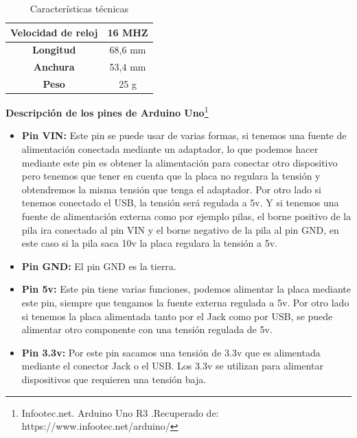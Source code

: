 \documentclass[12pt]{report}%
\begin{document}
\begin{table}[htbp]
\begin{tabular}{|c|c|}
\textbf{Velocidad de reloj}               & 16 MHZ                                                                                                                 \\ \hline
\textbf{Longitud}                         & 68,6 mm                                                                                                                \\ \hline
\textbf{Anchura}                          & 53,4 mm                                                                                                                \\ \hline
\textbf{Peso}                             & 25 g                                                                                                                   \\ \hline
\end{tabular}
\caption{Características técnicas}

\end{table}

\textbf{Descripción de los pines de Arduino Uno}\footnote{Infootec.net. Arduino Uno R3 .Recuperado de: https://www.infootec.net/arduino/}

\begin{itemize}
\item\textbf{Pin VIN:} 
Este pin se puede usar de varias formas, si tenemos una fuente de alimentación conectada mediante un adaptador, lo que podemos hacer mediante este pin es obtener la alimentación para conectar otro dispositivo pero tenemos que tener en cuenta que la placa no regulara la tensión y obtendremos la misma tensión que tenga el adaptador. Por otro lado si tenemos conectado el USB, la tensión será regulada a 5v. Y si tenemos una fuente de alimentación externa como por ejemplo pilas, el borne positivo de la pila ira conectado al pin VIN y el borne negativo de la pila al pin GND, en este caso si la pila saca 10v la placa regulara la tensión a 5v.
\item\textbf{Pin GND:} El pin GND es la tierra.
\item \textbf{Pin 5v:} Este pin tiene varias funciones, podemos alimentar la placa mediante este pin, siempre que tengamos la fuente externa regulada a 5v. Por otro lado si tenemos la placa alimentada tanto por el Jack como por USB, se puede alimentar otro componente con una tensión regulada de 5v.
\item \textbf{Pin 3.3v:} Por este pin sacamos una tensión de 3.3v que es alimentada mediante el conector Jack o el USB. Los 3.3v se utilizan para alimentar dispositivos que requieren una tensión baja.
\end{itemize}
\end{document}
